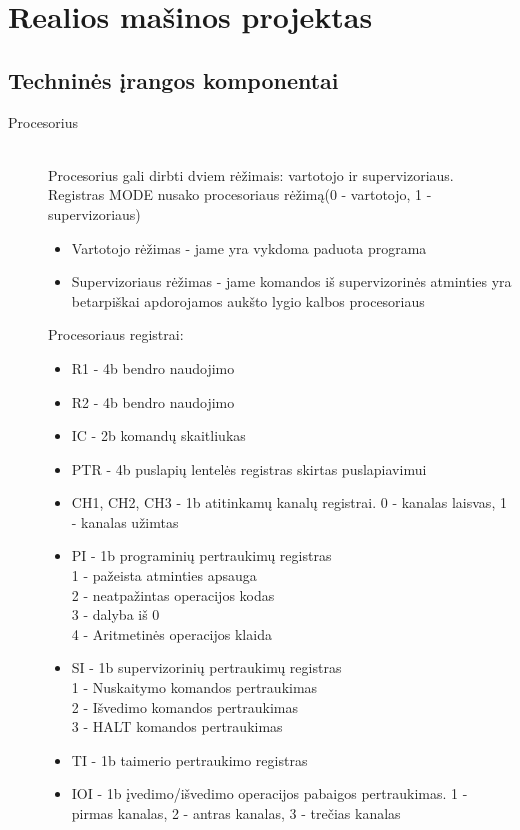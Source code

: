 \section{Realios mašinos projektas}

\subsection{Techninės įrangos komponentai}

\begin{description}
  \item[Procesorius]\leavevmode \\
Procesorius gali dirbti dviem rėžimais: vartotojo ir supervizoriaus. Registras MODE nusako procesoriaus rėžimą(0 - vartotojo, 1 - supervizoriaus)
\begin{itemize}
  \item Vartotojo rėžimas - jame yra vykdoma paduota programa
  \item Supervizoriaus rėžimas - jame komandos iš supervizorinės atminties yra betarpiškai apdorojamos aukšto lygio kalbos procesoriaus
\end{itemize}
Procesoriaus registrai:
\begin{itemize}
  \item R1 - 4b bendro naudojimo
  \item R2 - 4b bendro naudojimo
  \item IC - 2b komandų skaitliukas
  \item PTR - 4b puslapių lentelės registras skirtas puslapiavimui
  \item CH1, CH2, CH3 - 1b atitinkamų kanalų registrai. 0 - kanalas laisvas, 1 - kanalas užimtas
  \item PI - 1b programinių pertraukimų registras\leavevmode
		\\1 - pažeista atminties apsauga
		\\2 - neatpažintas operacijos kodas
		\\3 - dalyba iš 0
		\\4 - Aritmetinės operacijos klaida
  \item SI - 1b supervizorinių pertraukimų registras\leavevmode
		\\1 - Nuskaitymo komandos pertraukimas
		\\2 - Išvedimo komandos pertraukimas
		\\3 - HALT komandos pertraukimas
  \item TI - 1b taimerio pertraukimo registras
  \item IOI - 1b įvedimo/išvedimo operacijos pabaigos pertraukimas. 1 - pirmas kanalas, 2 - antras kanalas, 3 - trečias kanalas

\end{itemize}
\end{description}

